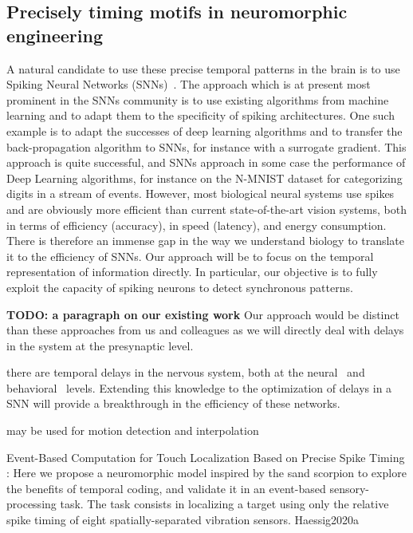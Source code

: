 \documentclass[brainsci, %
               review,submit,pdftex,moreauthors]{Definitions/mdpi}
\begin{document}
\subsection{Precisely timing motifs in neuromorphic engineering}
A natural candidate to use these precise temporal patterns in the brain is to use Spiking Neural Networks (SNNs)~\citep{maass_networks_1997}. The approach which is at present most prominent in the SNNs community is to use existing algorithms from machine learning and to adapt them to the specificity of spiking architectures. One such example is to adapt the successes of deep learning algorithms and to transfer the back-propagation algorithm to SNNs, for instance with a surrogate gradient. This approach is quite successful, and SNNs approach in some case the performance of Deep Learning algorithms, for instance on the N-MNIST dataset for categorizing digits in a stream of events. However, most biological neural systems use spikes and are obviously more efficient than current state-of-the-art vision systems, both in terms of efficiency (accuracy), in speed (latency), and energy consumption. There is therefore an immense gap in the way we understand biology to translate it to the efficiency of SNNs. Our approach will be to focus on the temporal representation of information directly. In particular, our objective is to fully exploit the capacity of spiking neurons to detect synchronous patterns.

\textbf{TODO: a paragraph on our existing work}
Our approach would be distinct than these approaches from us and colleagues as we will directly deal with delays in the system at the presynaptic level.

there are temporal delays in the nervous system, both at the neural~\citep{perrinet_active_2014} and behavioral~\citep{khoei_flash-lag_2017} levels. Extending this knowledge to the optimization of delays in a SNN will provide a breakthrough in the efficiency of these networks.

may be used for motion detection and interpolation~\citep{kaplan_anisotropic_2013}~\citep{khoei_flash-lag_2017}

Event-Based Computation for Touch Localization Based on Precise Spike Timing : Here we propose a neuromorphic model inspired by the sand scorpion to explore the benefits of temporal coding, and validate it in an event-based sensory-processing task. The task consists in localizing a target using only the relative spike timing of eight spatially-separated vibration sensors.  Haessig2020a
\end{document}
